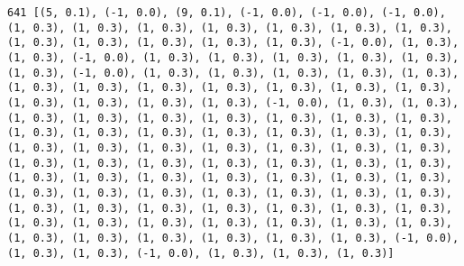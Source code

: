 \documentclass[11pt]{article}
\begin{document}
\begin{Verbatim}[commandchars=\\\{\}]
641 [(5, 0.1), (-1, 0.0), (9, 0.1), (-1, 0.0), (-1, 0.0), (-1, 0.0), (1, 0.3), (1, 0.3), (1, 0.3), (1, 0.3), (1, 0.3), (1, 0.3), (1, 0.3), (1, 0.3), (1, 0.3), (1, 0.3), (1, 0.3), (1, 0.3), (-1, 0.0), (1, 0.3), (1, 0.3), (-1, 0.0), (1, 0.3), (1, 0.3), (1, 0.3), (1, 0.3), (1, 0.3), (1, 0.3), (-1, 0.0), (1, 0.3), (1, 0.3), (1, 0.3), (1, 0.3), (1, 0.3), (1, 0.3), (1, 0.3), (1, 0.3), (1, 0.3), (1, 0.3), (1, 0.3), (1, 0.3), (1, 0.3), (1, 0.3), (1, 0.3), (1, 0.3), (-1, 0.0), (1, 0.3), (1, 0.3), (1, 0.3), (1, 0.3), (1, 0.3), (1, 0.3), (1, 0.3), (1, 0.3), (1, 0.3), (1, 0.3), (1, 0.3), (1, 0.3), (1, 0.3), (1, 0.3), (1, 0.3), (1, 0.3), (1, 0.3), (1, 0.3), (1, 0.3), (1, 0.3), (1, 0.3), (1, 0.3), (1, 0.3), (1, 0.3), (1, 0.3), (1, 0.3), (1, 0.3), (1, 0.3), (1, 0.3), (1, 0.3), (1, 0.3), (1, 0.3), (1, 0.3), (1, 0.3), (1, 0.3), (1, 0.3), (1, 0.3), (1, 0.3), (1, 0.3), (1, 0.3), (1, 0.3), (1, 0.3), (1, 0.3), (1, 0.3), (1, 0.3), (1, 0.3), (1, 0.3), (1, 0.3), (1, 0.3), (1, 0.3), (1, 0.3), (1, 0.3), (1, 0.3), (1, 0.3), (1, 0.3), (1, 0.3), (1, 0.3), (1, 0.3), (1, 0.3), (1, 0.3), (1, 0.3), (1, 0.3), (1, 0.3), (1, 0.3), (-1, 0.0), (1, 0.3), (1, 0.3), (-1, 0.0), (1, 0.3), (1, 0.3), (1, 0.3)]

\end{Verbatim}
\end{document}
